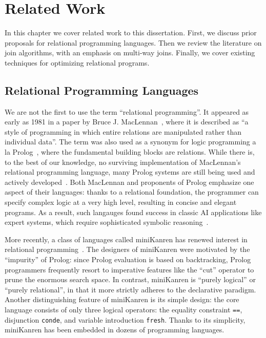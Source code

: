\chapter{Related Work}
\label{chap:related}

In this chapter we cover related work to this dissertation.
First, we discuss prior proposals for relational programming languages.
Then we review the literature on join algorithms, with an emphasis on multi-way joins.
Finally, we cover existing techniques for optimizing relational programs.

\section{Relational Programming Languages}
\label{sec:related:relational}

We are not the first to use the term ``relational programming''.
It appeared as early as 1981 in a paper by Bruce J. MacLennan~\cite{maclennan1981introduction}, 
 where it is described as ``a style of programming in which entire relations 
 are manipulated rather than individual data''.
The term was also used as a synonym for logic programming a la Prolog~\cite{colmerauer1990introduction}, 
 where the fundamental building blocks are relations.
While there is, to the best of our knowledge, no surviving implementation of MacLennan's relational programming language, 
 many Prolog systems are still being used and actively 
 developed~\cite{zhou2012language, bueno1997ciao, diaz2001design, prolog2021scryer, wielemaker2012swi}.
Both MacLennan and proponents of Prolog emphasize one aspect of their languages: 
 thanks to a relational foundation, the programmer can specify 
 complex logic at a very high level, resulting in concise and elegant programs.
As a result, such langauges found success in classic AI applications
 like expert systems, which require sophisticated symbolic reasoning~\cite{korner2022fifty}.

More recently, a class of languages called miniKanren has renewed interest 
 in relational programming~\cite{byrd2009relational, byrd2012minikanren, rozplokhas2019certified, DBLP:books/daglib/0015651}.
The designers of miniKanren were motivated by the ``impurity'' of Prolog: 
 since Prolog evaluation is based on backtracking, 
 Prolog programmers frequently resort to imperative features like the ``cut'' operator 
 to prune the enormous search space.
In contrast, miniKanren is ``purely logical'' or ``purely relational'', 
 in that it more strictly adheres to the declarative paradigm.
Another distinguishing feature of miniKanren is its simple design: 
 the core language consists of only three logical operators: 
 the equality constraint \verb|==|, disjunction \verb|conde|, 
 and variable introduction \verb|fresh|.
Thanks to its simplicity, miniKanren has been embedded in dozens of programming languages. 

